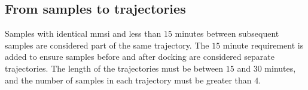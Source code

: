 \subsection{From samples to trajectories}\label{sec:from_ais_to_traj}
Samples with identical \acrshort{mmsi} and less than $15$ minutes between subsequent samples are considered part of the same trajectory. The $15$ minute requirement is added to ensure samples before and after docking are considered separate trajectories. The length of the trajectories must be between $15$ and $30$ minutes, and the number of samples in each trajectory must be greater than $4$. 
